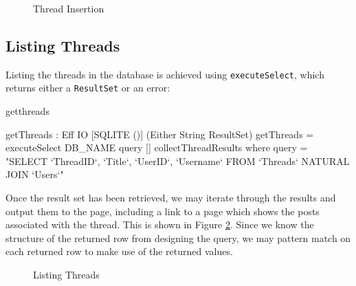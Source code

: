 \begin{figure}[h]
\caption{Thread Insertion}
\label{fig:threadins}
\end{figure}

\subsection{Listing Threads}

Listing the threads in the database is achieved using 
\texttt{executeSelect}, which returns either a
\texttt{ResultSet} or an error:

\begin{SaveVerbatim}{getthreads}

getThreads : Eff IO [SQLITE ()] (Either String ResultSet)
getThreads = 
    executeSelect DB_NAME query [] collectThreadResults
 where query = "SELECT `ThreadID`, `Title`, `UserID`, 
         `Username` FROM `Threads` NATURAL JOIN `Users`"

\end{SaveVerbatim}
\noindent
{}

\noindent 
Once the result set has been retrieved, we may iterate through the
results and output them to the page, including a link to a page which shows the
posts associated with the thread. This is shown in Figure \ref{fig:traverse}.
Since we know the structure of the returned
row from designing the query, we may pattern match on each returned row to make
use of the returned values.


\begin{figure}[h]
\caption{Listing Threads}
\label{fig:traverse}
\end{figure}


